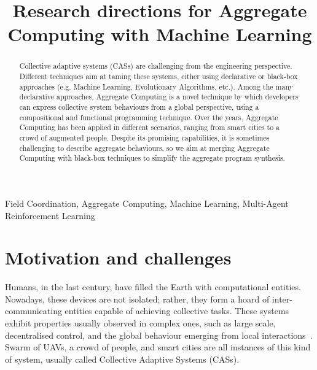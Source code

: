 \documentclass[conference]{IEEEtran}
\begin{document}
\title{Research directions for Aggregate Computing with Machine Learning}

\author{
}

\maketitle
\begin{abstract}
    Collective adaptive systems (CASs) are challenging from the engineering perspective. 
%
    Different techniques aim at taming these systems, either using declarative or black-box approaches (e.g. Machine Learning, Evolutionary Algorithms, etc.).
%
    Among the many declarative approaches, Aggregate Computing is a novel technique by which developers can express collective system behaviours from a global perspective, using a compositional and functional programming technique.
%
    Over the years, Aggregate Computing has been applied in different scenarios, ranging from smart cities to a crowd of augmented people. 
%
    Despite its promising capabilities, it is sometimes challenging to describe aggregate behaviours, so we aim at merging Aggregate Computing with black-box techniques to simplify the aggregate program synthesis.
\end{abstract}
\begin{IEEEkeywords}
Field Coordination, Aggregate Computing, Machine Learning, Multi-Agent Reinforcement Learning
\end{IEEEkeywords}

\section{Motivation and challenges}
Humans, in the last century, have filled the Earth with computational entities. 
%
%
Nowadays, these devices are not isolated; rather, they form a hoard of inter-communicating entities capable of achieving collective tasks.
% 
These systems exhibit properties usually observed in complex ones, such as large scale, decentralised control, and the global behaviour emerging from local interactions~\cite{DBLP:conf/huc/Ferscha15}.
% 
Swarm of UAVs, a crowd of people, and smart cities are all instances of this kind of system, usually called Collective Adaptive Systems (CASs).
\end{document}

